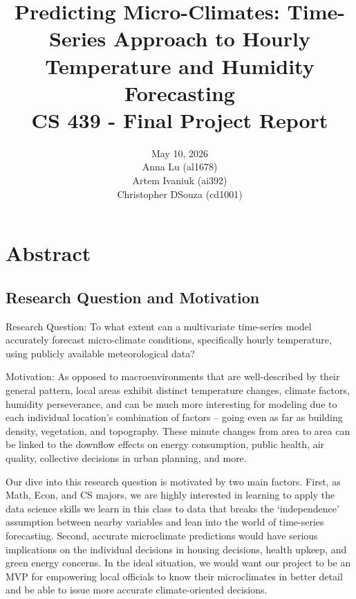 \documentclass{article}
\title{Predicting Micro-Climates: Time-Series Approach to Hourly Temperature and Humidity Forecasting \\ 
\large CS 439 - Final Project Report}
\author{%
      \begin{center}
        {\large May 10, 2026} \\
        {\large Anna Lu (al1678)} \\
        {\large Artem Ivaniuk (ai392)} \\
        {\large Christopher DSouza (cd1001)} \\
        \vspace{0.5cm}
    \end{center}
}
\begin{document}
\maketitle

\section{Abstract}
\subsection{Research Question and Motivation}

Research Question: To what extent can a multivariate time-series model accurately forecast micro-climate conditions, specifically hourly temperature, using publicly available meteorological data?

Motivation: 
As opposed to macroenvironments that are well-described by their general pattern, local areas exhibit distinct temperature changes, climate factors, humidity perseverance, and can be much more interesting for modeling due to each individual location's combination of factors -- going even as far as building density, vegetation, and topography. These minute changes from area to area can be linked to the downflow effects on energy consumption, public health, air quality, collective decisions in urban planning, and more. 


Our dive into this research question is motivated by two main factors. First, as Math, Econ, and CS majors, we are highly interested in learning to apply the data science skills we learn in this class to data that breaks the `independence' assumption between nearby variables and lean into the world of time-series forecasting. Second, accurate microclimate predictions would have serious implications on the individual decisions in housing decisions, health upkeep, and green energy concerns. In the ideal situation, we would want our project to be an MVP for empowering local officials to know their microclimates in better detail and be able to issue more accurate climate-oriented decisions. 
\end{document}
